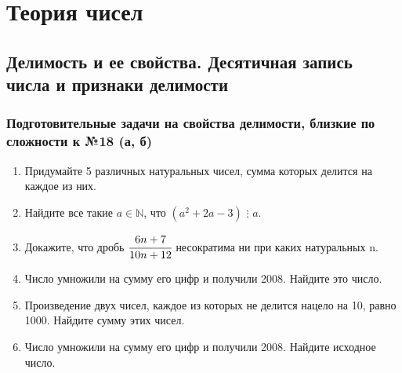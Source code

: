 \documentclass[12pt]{article}
\begin{document}
\section{Теория чисел}
\subsection{Делимость и ее свойства. Десятичная запись числа и признаки делимости}
\subsubsection*{Подготовительные задачи на свойства делимости, близкие по сложности к №18 (а, б)}
 \begin{enumerate}[start=1,label={\itshape\bfseries \arabic*.}]
	\item Придумайте 5 различных натуральных чисел, сумма которых делится на каждое из них.
	\item Найдите все такие $a \in \mathbb{N}$, что $(a^2 + 2a - 3)$ $\vdots$ $a$.
	\item Докажите, что дробь $\cfrac{6n + 7}{10n + 12}$ несократима ни при каких натуральных n.
	\item Число умножили на сумму его цифр и получили 2008. Найдите это число.
	\item Произведение двух чисел, каждое из которых не делится нацело на 10, равно 1000. Найдите сумму этих чисел.
	\item Число умножили на сумму его цифр и получили 2008. Найдите исходное число.
 \end{enumerate}
\end{document}

